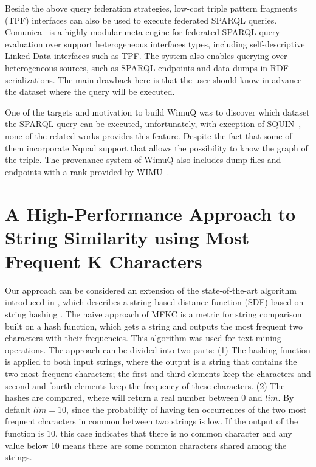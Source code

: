 Beside the above query federation strategies, low-cost triple pattern fragments (TPF) interfaces \cite{verborgh2016triple} can also be used to execute federated SPARQL queries. Comunica~\cite{taelman2018comunica} is a highly modular meta engine for federated SPARQL query evaluation over support heterogeneous interfaces types, including self-descriptive Linked Data interfaces such as TPF. The system also enables querying over heterogeneous sources, such as SPARQL endpoints and data dumps in RDF serializations. The main drawback here is that the user should know in advance the dataset where the query will be executed.

One of the targets and motivation to build WimuQ was to discover which dataset the SPARQL query can be executed, unfortunately, with exception of SQUIN~\cite{hartig2013squin}, none of the related works provides this feature. Despite the fact that some of them incorporate Nquad support that allows the possibility to know the graph of the triple. The provenance system of WimuQ also includes dump files and endpoints with a rank provided by WIMU~\cite{valdestilhas2018my}.

\section{A High-Performance Approach to String Similarity using Most Frequent K Characters}
Our approach can be considered an extension of the state-of-the-art algorithm introduced in \cite{seker2014novel}, %
which describes a string-based distance function (SDF) based on string hashing \cite{seker2013novel,rivest1992md5}.
The naive approach of MFKC \cite{seker2014novel} is a metric for string comparison built on a hash function, which gets a string and outputs the most frequent two characters with their frequencies. 
This algorithm was used for text mining operations.
The approach can be divided into two parts: 
(1) The hashing function is applied to both input strings, where the output is a string that contains the two most frequent characters;
the first and third elements keep the characters and second and fourth elements keep the frequency of these characters. 
(2) The hashes are compared, where will return a real number between $0$ and $lim$.
By default $lim=10$, since the probability of having ten occurrences of the two most frequent characters in common between two strings is low. 
If the output of the function is $10$, this case indicates that there is no common character and any value below $10$ means there are some common characters shared among the strings.

